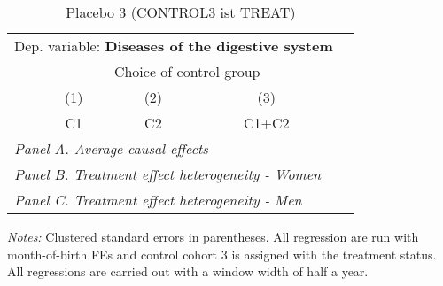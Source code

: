  \begin{table}[H] \centering \begin{threeparttable} \caption{Placebo 3 (CONTROL3 ist TREAT) } {\def\sym#1{\ifmmode^{#1}\else\(^{#1}\)\fi} \begin{tabular}{l*{4}{c}} \toprule \multicolumn{4}{l}{Dep. variable: \textbf{Diseases of the digestive system}} \\ & \multicolumn{3}{c}{Choice of control group} \\ \cmidrule(lr){2-4}
            &\multicolumn{1}{c}{(1)}&\multicolumn{1}{c}{(2)}&\multicolumn{1}{c}{(3)}\\
            &\multicolumn{1}{c}{C1}&\multicolumn{1}{c}{C2}&\multicolumn{1}{c}{C1+C2}\\
\midrule
 \multicolumn{4}{l}{\emph{Panel A. Average causal effects}} \\      \midrule\multicolumn{4}{l}{\emph{Panel B. Treatment effect heterogeneity - Women}} \\      \midrule\multicolumn{4}{l}{\emph{Panel C. Treatment effect heterogeneity - Men}} \\      
\bottomrule \end{tabular} } \begin{tablenotes} \item \scriptsize \emph{Notes:} Clustered standard errors in parentheses. All regression are run with month-of-birth FEs and control cohort 3 is assigned with the treatment status. All regressions are carried out with a window width of half a year. \end{tablenotes} \end{threeparttable} \end{table} 
